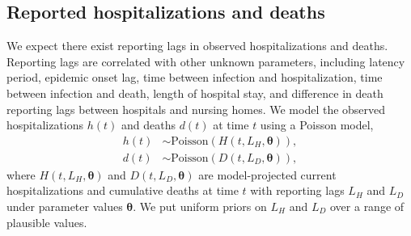 \documentclass[11pt]{article}
\newcommand{\btheta}{\boldsymbol{\theta}}
\begin{document}



\subsection{Reported hospitalizations and deaths} %

We expect there exist reporting lags in observed hospitalizations and deaths. Reporting lags are correlated with other unknown parameters, including latency period, epidemic onset lag, time between infection and hospitalization, time between infection and death, length of hospital stay, and difference in death reporting lags between hospitals and nursing homes. We model the observed hospitalizations $h(t)$ and deaths $d(t)$ at time $t$ using a Poisson model, 
\begin{align}
h(t) &\sim \mbox{Poisson}(H(t, L_H, \btheta)), \\
d(t) &\sim \mbox{Poisson}(D(t, L_D, \btheta)), 
\end{align}
where $H(t, L_H, \btheta)$ and $D(t, L_D, \btheta)$ are model-projected current hospitalizations and cumulative deaths at time $t$ with reporting lags $L_H$ and $L_D$ under parameter values $\btheta$. We put uniform priors on $L_H$ and $L_D$ over a range of plausible values. 
\end{document}
